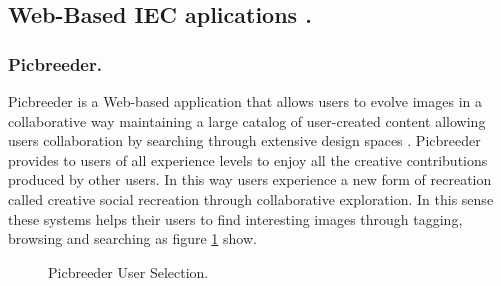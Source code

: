\subsection{Web-Based IEC aplications .}


\subsubsection{Picbreeder.}
Picbreeder is a Web-based application that allows users to evolve images in a
collaborative way maintaining a large catalog of user-created content allowing
users collaboration by searching through extensive design spaces
\cite{secretan2008picbreeder}. Picbreeder provides to users of all
experience levels to enjoy all the creative contributions produced by other
users. In this way users experience a new form of recreation called creative
social recreation through collaborative exploration. In this sense these systems
helps their users to find interesting images through tagging, browsing and
searching as figure  \ref{fig:Picbreeder} show.

\begin{figure}
\captionsetup{justification=centering,margin=2cm}
\centering
\setlength\fboxsep{0pt}
\setlength\fboxrule{0.7pt}
\caption{Picbreeder User Selection.}
\label{fig:Picbreeder}
\end{figure}

